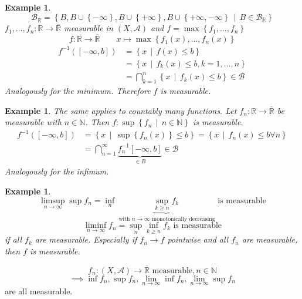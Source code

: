 \documentclass[a4paper]{article}
\newcounter{lecref}[section]
\numberwithin{lecref}{section}
\theoremstyle{break}
\newtheorem{example}[lecref]{Example}
\newcommand{\Set}[1]{\left\{#1\right\}}
\newcommand{\SetDef}[2]{\left\{#1\,\mid\,#2\right\}}
\newcommand{\Max}[1]{\max{\Set{#1}}}
\begin{document}
\begin{example} \hfill{}
  \[ \mathcal B_{\overline{\mathbb R}} = \SetDef{B, B \cup \Set{-\infty}, B \cup \Set{+\infty}, B \cup \Set{+\infty, -\infty}}{B \in \mathcal B_{\mathbb R}} \]
  $f_1, \dots, f_n: \mathbb R \to \overline{\mathbb R}$ measurable in $(X, \mathcal A)$ and $f = \Max{f_1, \dots, f_n}$
  \[ f: \mathbb R \to \overline{\mathbb R} \qquad x \mapsto \max\Set{f_1(x), \dots, f_n(x)} \]
  \begin{align*}
    f^{-1}([-\infty, b]) &= \SetDef{x}{f(x) \leq b} \\
      &= \SetDef{x}{f_k(x) \leq b, k = 1, \dots, n} \\
      &= \bigcap_{k=1}^n \SetDef{x}{f_k(x) \leq b} \in \mathcal B
  \end{align*}
  Analogously for the minimum.
  Therefore $f$ is measurable.
\end{example}

\begin{example}
  The same applies to countably many functions.
  Let $f_n: \mathbb R \to \overline{\mathbb R}$ be measurable with $n \in \mathbb N$.
  Then $f: \sup\SetDef{f_n}{n \in \mathbb N}$ is measurable.
  \begin{align*}
    f^{-1}([-\infty, b]) &= \SetDef{x}{\sup\Set{f_n(x)} \leq b} = \SetDef{x}{f_n(x) \leq b \forall n} \\
      &= \bigcap_{n=1}^\infty \underbrace{f_n^{-1} [-\infty, b]}_{\in B} \in \mathcal B
  \end{align*}
  Analogously for the infimum.
\end{example}

\begin{example}
  \[ \limsup_{n\to\infty} \sup{f_n} = \inf_n \underbrace{\sup_{k \geq n} f_k}_{\text{ with } n\to\infty \text{ monotonically decreasing}} \text{ is measurable} \]
  \[ \liminf_{n\to\infty} f_n = \sup_n \inf_{k \geq n} f_k \text{ is measurable} \]
  if all $f_k$ are measurable. Especially if $f_n \to f$ pointwise and all $f_n$ are measurable, then $f$ is measurable.
\end{example}

\begin{theorem}
  \[ f_n: (X, \mathcal A) \to \overline{\mathbb R} \text{ measurable}, n \in \mathbb N \]
  \[ \implies \inf{f_n}, \sup{f_n}, \lim_{n\to\infty} \inf{f_n}, \lim_{n\to\infty} \sup{f_n} \]
  are all measurable.
\end{theorem}

\end{document}

